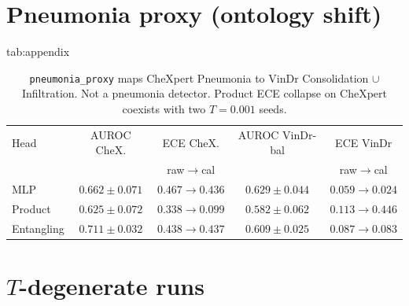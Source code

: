 \documentclass{midl} %
\begin{document}
\clearpage
{}




\appendix

\section{Pneumonia proxy (ontology shift)}

\begin{table}[h]
\floatconts
  {tab:appendix}
  {\caption{\texttt{pneumonia\_proxy} maps CheXpert Pneumonia to VinDr Consolidation $\cup$ Infiltration. Not a pneumonia detector. Product ECE collapse on CheXpert coexists with two $T=0.001$ seeds.}}
  {\setlength{\tabcolsep}{4pt}\begin{tabular}{@{}lcccc@{}}
  \toprule
  Head & AUROC CheX. & ECE CheX. & AUROC VinDr-bal & ECE VinDr \\
       & & raw$\to$cal & & raw$\to$cal \\
  \midrule
  MLP & $0.662\pm0.071$ & $0.467\to0.436$ & $0.629\pm0.044$ & $0.059\to0.024$ \\
  Product & $0.625\pm0.072$ & $0.338\to0.099$ & $0.582\pm0.062$ & $0.113\to0.446$ \\
  Entangling & $0.711\pm0.032$ & $0.438\to0.437$ & $0.609\pm0.025$ & $0.087\to0.083$ \\
  \bottomrule
  \end{tabular}}
\end{table}

\section{$T$-degenerate runs}
\label{app:degenerate}
\end{document}
